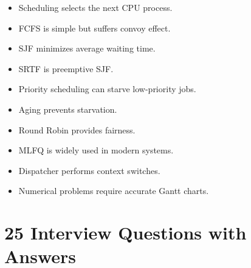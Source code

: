 \begin{itemize}
\item Scheduling selects the next CPU process.
\item FCFS is simple but suffers convoy effect.
\item SJF minimizes average waiting time.
\item SRTF is preemptive SJF.
\item Priority scheduling can starve low-priority jobs.
\item Aging prevents starvation.
\item Round Robin provides fairness.
\item MLFQ is widely used in modern systems.
\item Dispatcher performs context switches.
\item Numerical problems require accurate Gantt charts.
\end{itemize}

\section{25 Interview Questions with Answers}

